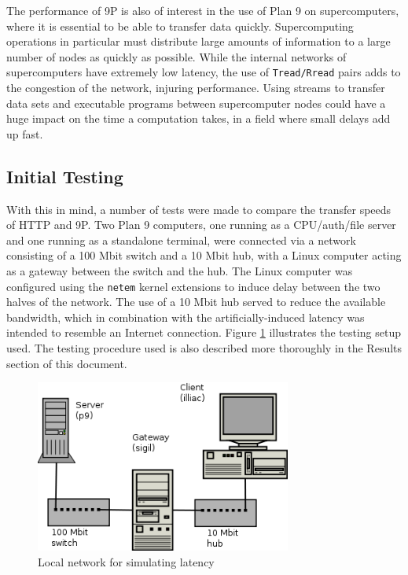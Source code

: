 \documentclass[11pt,american]{report}
\begin{document}
The performance of 9P is also of interest in the use of Plan 9 on supercomputers, where it is essential to be able to transfer data quickly. Supercomputing operations in particular must distribute large amounts of information to a large number of nodes as quickly as possible. While the internal networks of supercomputers have extremely low latency, the use of {\tt Tread/Rread} pairs adds to the congestion of the network, injuring performance. Using streams to transfer data sets and executable programs between supercomputer nodes could have a huge impact on the time a computation takes, in a field where small delays add up fast.

\subsection{Initial Testing}
With this in mind, a number of tests were made to compare the transfer speeds of HTTP and 9P. Two Plan 9 computers, one running as a CPU/auth/file server and one running as a standalone terminal, were connected via a network consisting of a 100 Mbit switch and a 10 Mbit hub, with a Linux computer acting as a gateway between the switch and the hub. The Linux computer was configured using the {\tt netem} kernel extensions to induce delay between the two halves of the network. The use of a 10 Mbit hub served to reduce the available bandwidth, which in combination with the artificially-induced latency was intended to resemble an Internet connection. Figure \ref{figure:network} illustrates the testing setup used. The testing procedure used is also described more thoroughly in the Results section of this document.

\begin{figure}[h]
	\begin{center}
		\includegraphics[width=0.75\textwidth]{network.png}
	\end{center}
	\caption{Local network for simulating latency}
	\label{figure:network}
\end{figure}
\end{document}
